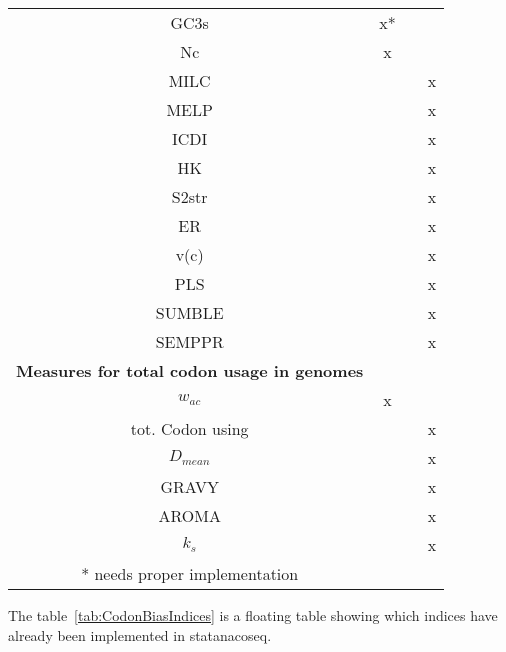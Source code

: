 \begin{table}[tb]
\begin{footnotesize}
\begin{tabular}{cccc}
	GC3s		& x* & &	 \\
	Nc		& x & &	 \\
	MILC		& & & x	 \\
	MELP		& & & x	 \\
	ICDI		& & & x	 \\
	HK		& & & x	 \\
	S2str	& & & x	 \\
	ER		& & & x	 \\
	v(c)		& & & x	 \\
	PLS		& & & x	 \\
	SUMBLE		& & & x	 \\
	SEMPPR		& & & x	 \\
	\midrule	
\textbf{Measures for total codon usage in genomes} \\
	$w_{ac}$	& x & & 	 \\
	\midrule	
	tot. Codon using		& & & x	 \\
	$D_{mean}$		& & & x	 \\
	GRAVY		& & & x	 \\
	AROMA		& & & x	 \\
	$k_s$		& & & x	 \\
\bottomrule 

* needs proper implementation
\end{tabular}
\end{footnotesize}
\end{table}



The table~\ref{tab:CodonBiasIndices} is a floating table showing which indices have already been implemented in statanacoseq.

